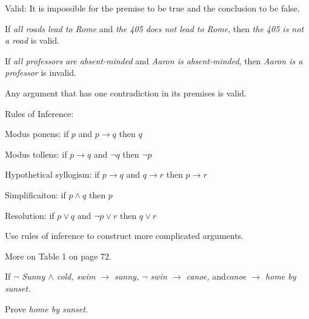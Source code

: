 \begin{defn}

Valid: It is impossible for the premise to be true and the conclusion to be false.

\end{defn}

\begin{ex}

If \textit{all roads lead to Rome} and \textit{the 405 does not lead to Rome}, then \textit{the 405 is not a road} is valid.

\end{ex}

\begin{ex}

If \textit{all professors are absent-minded} and \textit{Aaron is absent-minded}, then \textit{Aaron is a professor} is invalid.

\end{ex}

\begin{remark}

Any argument that has one contradiction in its premises is valid.

\end{remark}

Rules of Inference:

Modus ponens: if $p$ and $p \rightarrow q$ then $q$

Modus tollens: if $p \rightarrow q$ and $\lnot q$ then $\lnot p$

Hypothetical syllogism: if $p \rightarrow q$ and $q \rightarrow r$ then $p \rightarrow r$

Simplificaiton: if $p \land q$ then $p$

Resolution: if $p \lor q$ and $\lnot p \lor r$ then $q \lor r$

Use rules of inference to construct more complicated arguments.

More on Table 1 on page 72.

\begin{ex}

If \textit{$\lnot$ Sunny $\land$ cold, swim $\rightarrow$ sunny, $\lnot$ swin $\rightarrow$ canoe, }and\textit{canoe $\rightarrow$ home by sunset.}

Prove \textit{home by sunset.}

\end{ex}

